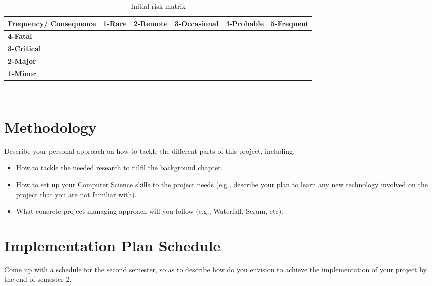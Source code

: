 \begin{table}[h]
\centering
\scriptsize
\caption{Initial risk matrix}
\begin{tabular}{|p{2cm}|p{2cm}|p{2cm}| p{2cm} |p{2cm}| p{2cm}|}
\hline \bf Frequency/ Consequence & \bf 1-Rare & \bf 2-Remote & \bf 3-Occasional & \bf 4-Probable & \bf 5-Frequent\\ [10pt]

\hline \bf 4-Fatal & \cellcolor{yellow!50} & \cellcolor{red!50} & \cellcolor{red!50} & \cellcolor{red!50} &\cellcolor{red!50} \\ [10pt]

\hline \bf 3-Critical &\cellcolor{green!50} & \cellcolor{yellow!50} & \cellcolor{yellow!50} & \cellcolor{red!50} &\cellcolor{red!50} \\ [10pt]

\hline \bf 2-Major & \cellcolor{green!50} & \cellcolor{green!50} & \cellcolor{yellow!50} &\cellcolor{yellow!50} &\cellcolor{red!50} \\ [10pt]

\hline \bf 1-Minor & \cellcolor{green!50} & \cellcolor{green!50} & \cellcolor{green!50} &\cellcolor{yellow!50} &\cellcolor{yellow!50} \\ [10pt]
\hline
\end{tabular} \\
\label{tab:ProjRisks}
\end{table}

\section{Methodology}
Describe your personal approach on how to tackle the different parts of this project, including:
\begin{itemize}
    \item How to tackle the needed research to fulfil the background chapter. 
    \item How to set up your Computer Science skills to the project needs (e.g., describe your plan to learn any new technology involved on the project that you are not familiar with). 
    \item What concrete project managing approach will you follow (e.g., Waterfall, Scrum, etc).
\end{itemize}

\section{Implementation Plan Schedule}
Come up with a schedule for the second semester, so as to describe how do you envision to achieve the implementation of your project by the end of semester 2.

